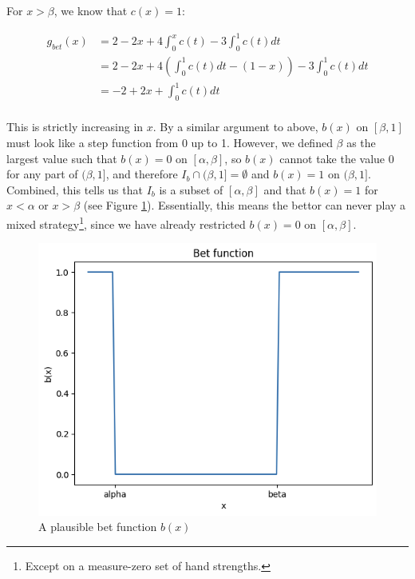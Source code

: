 \documentclass[a4paper,12pt]{article}
\begin{document}
For $x > \beta$, we know that $c(x) = 1$:

\begin{align*}
    g_{bet}(x) &= 2 - 2x + 4 \int_{0}^{x} c(t) - 3 \int_{0}^{1} c(t) dt \\
    &= 2 -  2x + 4\left( \int_{0}^{1}c(t) dt - (1-x) \right) - 3 \int_{0}^{1} c(t) dt\\
    &= -2 + 2x + \int_{0}^{1}c(t) dt \\
\end{align*}

This is strictly increasing in $x$. By a similar argument to above, $b(x)$ on $[\beta, 1]$ must look like a step function from 0 up to 1. However, we defined $\beta$ as the largest value such that $b(x) = 0$ on $[\alpha, \beta]$, so $b(x)$ cannot take the value 0 for any part of $(\beta, 1]$, and therefore $I_b \cap (\beta, 1] = \emptyset$ and $b(x) = 1$ on $(\beta, 1]$.\\ 

Combined, this tells us that $I_b$ is a subset of $[\alpha, \beta]$ and that $b(x) = 1$ for $x < \alpha$ or $x > \beta$ (see Figure \ref{bet_function}). Essentially, this means the bettor can never play a mixed strategy\footnote{Except on a measure-zero set of hand strengths.}, since we have already restricted $b(x) = 0$ on $[\alpha, \beta]$.


\begin{figure}
    \begin{center}
    \includegraphics*[scale=0.4]{../bet_function.png}
    \caption{A plausible bet function $b(x)$}
    \label{bet_function}
    \end{center}
\end{figure}
\end{document}
